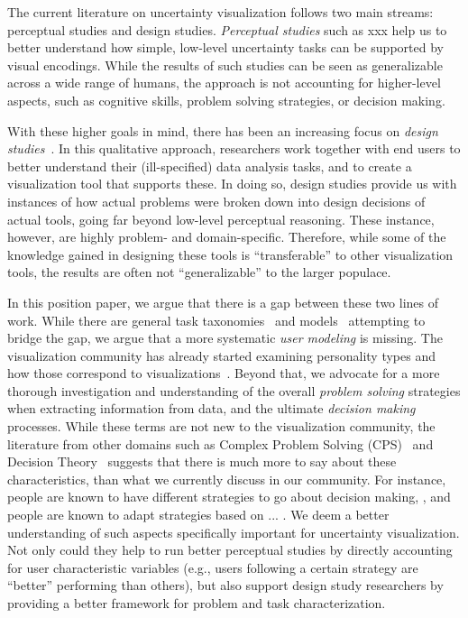 
The current literature on uncertainty visualization follows two main streams: perceptual studies and design studies.
\emph{Perceptual studies} such as xxx help us to better understand 
how simple, low-level uncertainty tasks can be supported by visual encodings. 
While the results of such studies can be seen as generalizable across a wide 
range of humans, the approach is not accounting for higher-level aspects, such as cognitive skills,
problem solving strategies, or decision making.

With these higher goals in mind, there has been an increasing focus on \emph{design studies}~\citep{Sedlmair:2012}.
In this qualitative approach, researchers work together with end users to better understand their 
(ill-specified) data analysis tasks, and to create a visualization tool
that supports these. In doing so, design studies provide us with instances of how
actual problems were broken down into design decisions of actual tools, going far beyond
low-level perceptual reasoning. These instance, however, are highly problem- and domain-specific.
Therefore, while some of the knowledge gained in designing these tools is
``transferable'' to other visualization tools, the results are often not
``generalizable'' to the larger populace.

In this position paper, we argue that there is a gap between these two lines of work.
While there are general task taxonomies~\citep{Brehmer:2013,Shneiderman:1996} and 
models~\citep{Meyer:2012,Sacha:2014}
%
%
attempting to bridge the gap, we argue that a more systematic \emph{user modeling } is missing.
The visualization community has already started examining personality types and
how those correspond to visualizations~\citep{Conati:2014}. Beyond that, we advocate for a more thorough 
investigation and understanding of the overall \emph{problem solving} strategies when extracting information from data, 
and the ultimate \emph{decision making} processes.
While these terms are not new to the visualization community, the 
literature from other domains such as Complex Problem Solving (CPS)~\citep{Frensch:2005}
and Decision Theory~\citep{Payne:1993} suggests that there is much more to say about these characteristics,
than what we currently discuss in our community. For instance, people are known to have different strategies to go about decision making,
, and people are known to adapt strategies based on ... .
We deem a better understanding of such aspects specifically important for uncertainty visualization.
Not only could they help to run better perceptual studies by directly accounting for user characteristic variables 
(e.g., users following a certain strategy are ``better'' performing than others), but also support design study researchers
by providing a better framework for problem and task characterization.

